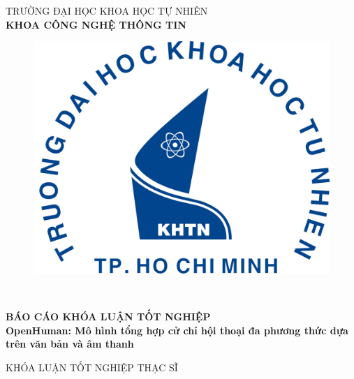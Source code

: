 \begin{titlepage}

\begin{center}
TRƯỜNG ĐẠI HỌC KHOA HỌC TỰ NHIÊN\\
\textbf{KHOA CÔNG NGHỆ THÔNG TIN}\\[2cm]

\begin{figure}[htp]
\centering
\includegraphics[width=8 cm]{images/logo-khtn.png}
{\\[1cm]}
\end{figure}

{ \Large \bfseries \tenSV \\[1cm] } 


{ \Large \bfseries BÁO CÁO KHÓA LUẬN TỐT NGHIỆP \\
	OpenHuman: Mô hình tổng hợp cử chỉ hội thoại đa phương
	thức dựa trên văn bản và âm thanh
\\ [2cm]}


\large KHÓA LUẬN TỐT NGHIỆP THẠC SĨ\\



\end{center}
\end{titlepage}
